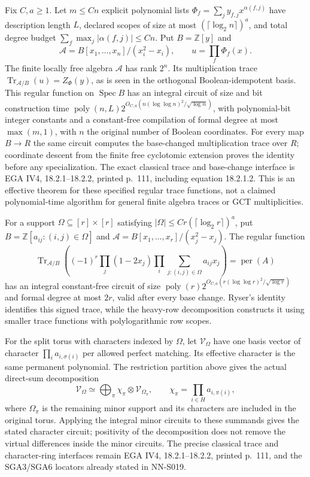 Fix $C,a\ge1$.  Let $m\le Cn$ explicit polynomial lists
$\Phi_f=\sum_j y_{f,j}x^{\alpha(f,j)}$ have description
length $L$, declared scopes of size at most
$(\lceil\log_2n\rceil)^a$, and total degree budget
$\sum_f\max_j|\alpha(f,j)|\le Cn$.  Put $B=\mathbb Z[y]$ and
\[
 \mathscr A=B[x_1,\ldots,x_n]/(x_i^2-x_i),\qquad
                       u=\prod_f\Phi_f(x).
\]
The finite locally free algebra $\mathscr A$ has rank $2^n$.
Its multiplication trace
$\operatorname{Tr}_{\mathscr A/B}(u)=Z_\Phi(y)$, as is
seen in the orthogonal Boolean-idempotent basis.  This
regular function on $\operatorname{Spec}B$ has an integral
circuit of size and bit construction time
$\operatorname{poly}(n,L)2^{O_{C,a}(n(\log\log n)^2/\sqrt{\log n})}$,
with polynomial-bit integer constants and a constant-free
compilation of formal degree at most $\max(m,1)$, with $n$
the original number of Boolean coordinates.  For every map
$B\to R$ the same circuit computes the base-changed
multiplication trace over $R$; coordinate descent from
the finite free cyclotomic extension proves the identity
before any specialization.  The exact classical trace
and base-change interface is EGA IV4, 18.2.1--18.2.2,
printed p.~111, including equation 18.2.1.2.  This is an
effective theorem for these specified regular trace
functions, not a claimed polynomial-time algorithm for
general finite algebra traces or GCT multiplicities.

For a support $\Omega\subseteq[r]\times[r]$ satisfying
$|\Omega|\le Cr(\lceil\log_2r\rceil)^a$, put
$B=\mathbb Z[a_{ij}:(i,j)\in\Omega]$ and
$\mathscr A=B[x_1,\ldots,x_r]/(x_j^2-x_j)$.  The regular
function
\[
 \operatorname{Tr}_{\mathscr A/B}\left(
     (-1)^r\prod_j(1-2x_j)
                 \prod_i\sum_{j:(i,j)\in\Omega}a_{ij}x_j\right)
                              =\operatorname{per}(A)
\]
has an integral constant-free circuit of size
$\operatorname{poly}(r)2^{O_{C,a}(r(\log\log r)^2/\sqrt{\log r})}$
and formal degree at most $2r$, valid after every base
change.  Ryser's identity identifies this signed trace,
while the heavy-row decomposition constructs it using
smaller trace functions with polylogarithmic row scopes.

For the split torus with characters indexed by $\Omega$,
let $\mathcal V_\Omega$ have one basis vector of character
$\prod_i a_{i,\sigma(i)}$ per allowed perfect matching.
Its effective character is the same permanent polynomial.
The restriction partition above gives the actual direct-sum
decomposition
\[
 \mathcal V_\Omega\simeq
  \bigoplus_{\pi}
    \chi_\pi\otimes\mathcal V_{\Omega_\pi},
 \qquad \chi_\pi=\prod_{i\in H}a_{i,\pi(i)},
\]
where $\Omega_\pi$ is the remaining minor support and its
characters are included in the original torus.  Applying
the integral minor circuits to these summands gives the
stated character circuit; positivity of the decomposition
does not remove the virtual differences inside the minor
circuits.  The precise classical trace and character-ring
interfaces remain EGA IV4, 18.2.1--18.2.2, printed p.~111,
and the SGA3/SGA6 locators already stated in NN-S019.

